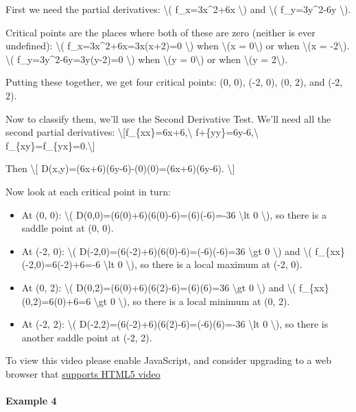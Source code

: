 First we need the partial derivatives: \textbackslash{}( f\_x=3x\^{}2+6x
\textbackslash{}) and \textbackslash{}( f\_y=3y\^{}2-6y
\textbackslash{}).

Critical points are the places where both of these are zero (neither is
ever undefined): \textbackslash{}( f\_x=3x\^{}2+6x=3x(x+2)=0
\textbackslash{}) when \textbackslash{}(x = 0\textbackslash{}) or when
\textbackslash{}(x = -2\textbackslash{}). \textbackslash{}(
f\_y=3y\^{}2-6y=3y(y-2)=0 \textbackslash{}) when \textbackslash{}(y =
0\textbackslash{}) or when \textbackslash{}(y = 2\textbackslash{}).

Putting these together, we get four critical points: (0, 0), (-2, 0),
(0, 2), and (-2, 2).

Now to classify them, we'll use the Second Derivative Test. We'll need
all the second partial derivatives:
\textbackslash{}{[}f\_\{xx\}=6x+6,\textbackslash{}
f+\{yy\}=6y-6,\textbackslash{} f\_\{xy\}=f\_\{yx\}=0.\textbackslash{}{]}

Then \textbackslash{}{[} D(x,y)=(6x+6)(6y-6)-(0)(0)=(6x+6)(6y-6).
\textbackslash{}{]}

Now look at each critical point in turn:

\begin{itemize}
\tightlist
\item
  At (0, 0): \textbackslash{}( D(0,0)=(6(0)+6)(6(0)-6)=(6)(-6)=-36
  \textbackslash{}lt 0 \textbackslash{}), so there is a saddle point at
  (0, 0).
\item
  At (-2, 0): \textbackslash{}( D(-2,0)=(6(-2)+6)(6(0)-6)=(-6)(-6)=36
  \textbackslash{}gt 0 \textbackslash{}) and \textbackslash{}(
  f\_\{xx\}(-2,0)=6(-2)+6=-6 \textbackslash{}lt 0 \textbackslash{}), so
  there is a local maximum at (-2, 0).
\item
  At (0, 2): \textbackslash{}( D(0,2)=(6(0)+6)(6(2)-6)=(6)(6)=36
  \textbackslash{}gt 0 \textbackslash{}) and \textbackslash{}(
  f\_\{xx\}(0,2)=6(0)+6=6 \textbackslash{}gt 0 \textbackslash{}), so
  there is a local minimum at (0, 2).
\item
  At (-2, 2): \textbackslash{}( D(-2,2)=(6(-2)+6)(6(2)-6)=(-6)(6)=-36
  \textbackslash{}lt 0 \textbackslash{}), so there is another saddle
  point at (-2, 2).
\end{itemize}

To view this video please enable JavaScript, and consider upgrading to a
web browser that \href{http://videojs.com/html5-video-support/}{supports
HTML5 video}

\hypertarget{example-4}{%
\paragraph{Example 4}\label{example-4}}

